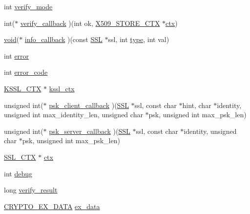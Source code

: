 \begin{DoxyCompactItemize}
int \hyperlink{structssl__st_a96628f727de36322f51c8833ecd26668}{verify\+\_\+mode}
\item 
int($\ast$ \hyperlink{structssl__st_abe8961b76f34a37acc0693435919e301}{verify\+\_\+callback} )(int ok, \hyperlink{crypto_2ossl__typ_8h_ae681945a2cf88d6337137dc0260a1545}{X509\+\_\+\+S\+T\+O\+R\+E\+\_\+\+C\+TX} $\ast$\hyperlink{structssl__st_a3c9a7f22a3c11e074d2a898fb813ebb4}{ctx})
\item 
\hyperlink{hw__4758__cca_8h_afad4d591c7931ff6dc5bf69c76c96aa0}{void}($\ast$ \hyperlink{structssl__st_a185f1e577fa5512b45a82a08e1b28805}{info\+\_\+callback} )(const \hyperlink{crypto_2ossl__typ_8h_a71f21e09bf365489dab9d85bd4785e24}{S\+SL} $\ast$ssl, int \hyperlink{structssl__st_ac765329451135abec74c45e1897abf26}{type}, int val)
\item 
int \hyperlink{structssl__st_a11614f44ef4d939bdd984953346a7572}{error}
\item 
int \hyperlink{structssl__st_a7d16b1c68c87cec009d972e79abfba78}{error\+\_\+code}
\item 
\hyperlink{include_2openssl_2kssl_8h_af0a6223eb6dfde63f59fd77be6f267eb}{K\+S\+S\+L\+\_\+\+C\+TX} $\ast$ \hyperlink{structssl__st_a87b1b8010d19c39d5f20a64a3ca66d55}{kssl\+\_\+ctx}
\item 
unsigned int($\ast$ \hyperlink{structssl__st_a71fd3455fac589a1f9bdc9f8520aa4e5}{psk\+\_\+client\+\_\+callback} )(\hyperlink{crypto_2ossl__typ_8h_a71f21e09bf365489dab9d85bd4785e24}{S\+SL} $\ast$ssl, const char $\ast$hint, char $\ast$identity, unsigned int max\+\_\+identity\+\_\+len, unsigned char $\ast$psk, unsigned int max\+\_\+psk\+\_\+len)
\item 
unsigned int($\ast$ \hyperlink{structssl__st_add4c613e3361a1ec0167149c336ea84d}{psk\+\_\+server\+\_\+callback} )(\hyperlink{crypto_2ossl__typ_8h_a71f21e09bf365489dab9d85bd4785e24}{S\+SL} $\ast$ssl, const char $\ast$identity, unsigned char $\ast$psk, unsigned int max\+\_\+psk\+\_\+len)
\item 
\hyperlink{crypto_2ossl__typ_8h_a1a21892c1193ee6eb572c2c72d3924ca}{S\+S\+L\+\_\+\+C\+TX} $\ast$ \hyperlink{structssl__st_a3c9a7f22a3c11e074d2a898fb813ebb4}{ctx}
\item 
int \hyperlink{structssl__st_ac3e1795766a80ec63b157951b4b9a7d4}{debug}
\item 
long \hyperlink{structssl__st_a84b50be28bacc0340589457fc52d554a}{verify\+\_\+result}
\item 
\hyperlink{crypto_2ossl__typ_8h_a7eaff1c18057495d8af18f22d1370b51}{C\+R\+Y\+P\+T\+O\+\_\+\+E\+X\+\_\+\+D\+A\+TA} \hyperlink{structssl__st_ac3e4fd59d6ee44a81f3a58114613c1e2}{ex\+\_\+data}

\end{DoxyCompactItemize}
